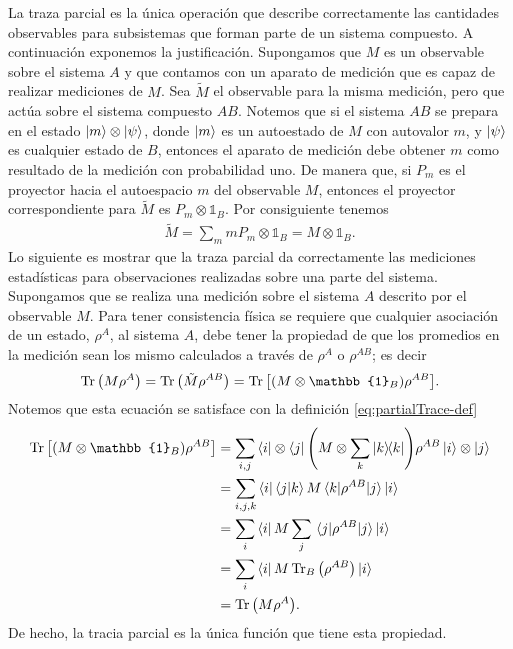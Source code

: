 La traza parcial es la única operación que describe correctamente 
las cantidades observables para subsistemas que forman parte de un
sistema compuesto. A continuación exponemos la justificación.
Supongamos que $M$ es un observable sobre el sistema $A$ y que
contamos con un aparato de medición que es capaz de realizar mediciones
de $M$. Sea $\tilde{M}$ el observable para la misma medición, pero 
que actúa sobre el sistema compuesto $AB$. Notemos que si el sistema
$AB$ se prepara en el estado $\ket{m}\otimes \ket{\psi}$, donde $\ket{m}$
es un autoestado de $M$ con autovalor $m$, y $\ket{\psi}$ es 
cualquier estado de $B$, entonces el aparato de medición 
debe obtener $m$ como resultado de la medición con probabilidad uno.
De manera que, si $P_m$ es el proyector hacia el autoespacio $m$ del
observable $M$, entonces el proyector correspondiente para $\tilde{M}$
es $P_m\otimes \mathbb{1}_B$. Por consiguiente tenemos
\begin{align}
	\tilde{M} = \sum_m mP_m\otimes \mathbb{1}_B=M\otimes \mathbb{1}_B.
\end{align}
Lo siguiente es mostrar que la traza parcial da correctamente las 
mediciones estadísticas para observaciones realizadas sobre una 
parte del sistema. Supongamos que se realiza una medición sobre
el sistema $A$ descrito por el observable $M$. Para tener 
consistencia física se requiere que cualquier asociación de un estado,
$\rho^A$, al sistema $A$, debe tener la propiedad de que los promedios
en la medición sean los mismo calculados a través de $\rho^A$ o $\rho^{AB}$;
es decir
\begin{align}
	\Tr \qty(M\rho^A) = \Tr \qty(\tilde{M}\rho^{AB}) = 
	\Tr \qty[\qty(M\otimes\mathbb{1}_B)\rho^{AB}].
\end{align}
Notemos que esta ecuación se satisface con la definición
\eqref{eq:partialTrace-def}
\begin{align}
	\Tr \qty[\qty(M\otimes\mathbb{1}_B)\rho^{AB}] 
	&= \sum_{i,j} \bra{i}\tensor\bra{j}	\qty(M\tensor \sum_k\dyad{k}{k})
	\rho^{AB}
	\ket{i}\tensor\ket{j} \nonumber \\
	&= \sum_{i,j,k} \bra{i}\braket{j}{k}M\matrixel{k}{\rho^{AB}}{j}\ket{i}
  \nonumber \\
	&= \sum_{i} \bra{i}M\sum_j \matrixel{j}{\rho^{AB}}{j}\ket{i} \nonumber \\
	&= \sum_i \bra{i}M\Tr_B\qty(\rho^{AB})\ket{i} \nonumber \\
	&= \Tr\qty(M \rho^A).
\end{align}
De hecho, la tracia parcial es la única función que tiene esta propiedad.
